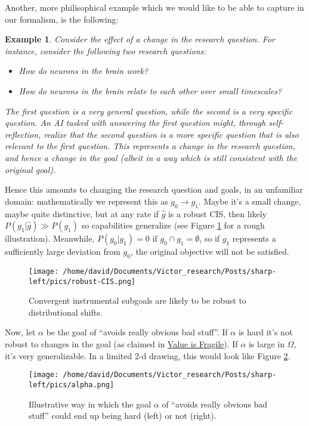 \documentclass{article}
\newtheorem{example}{Example}
\begin{document}
Another, more philisophical example which we would like to be able to capture in our formalism, is the following:

\begin{example}
    Consider the effect of a change in the research question. For instance, consider the following two research questions: 
    \begin{itemize}
        \item How do neurons in the brain work?
        \item How do neurons in the brain relate to each other over small timescales?
    \end{itemize}
    The first question is a very general question, while the second is a very specific question. An AI tasked with answering the first question might, through self-reflection, realize that the second question is a more specific question that is also relevant to the first question. This represents a change in the research question, and hence a change in the goal (albeit in a way which is still consistent with the original goal).
\end{example}

Hence this amounts to changing the research question and goals, in an unfamiliar domain: mathematically we represent this as $g_0 \rightarrow g_1$. Maybe it's a small change, maybe quite distinctive, but at any rate if $\hat{g}$ is a robust CIS, then likely $P(g_1|\hat{g})\gg P(g_1)$ so capabilities generalize (see Figure \ref{fig:robust-CIS} for a rough illustration). Meanwhile, $P(g_0|g_1)=0$ if $g_0 \cap g_1 = \emptyset$, so if $g_1$ represents a sufficiently large deviation from $g_0$, the original objective will not be satisfied.

\begin{figure}[ht]
    \centering
    \texttt{[image: /home/david/Documents/Victor\_research/Posts/sharp-left/pics/robust-CIS.png]} 
    \caption{Convergent instrumental subgoals are likely to be robust to distributional shifts.}
    \label{fig:robust-CIS} 
\end{figure}

Now, let $\alpha$ be the goal of ``avoids really obvious bad stuff''. If $\alpha$ is hard it's not robust to changes in the goal (as claimed in \href{https://www.lesswrong.com/posts/GNnHHmm8EzePmKzPk/value-is-fragile}{Value is Fragile}). If $\alpha$ is large in $\Omega$, it's very generalizable. In a limited 2-d drawing, this would look like Figure \ref{fig:alpha}.

\begin{figure}[ht]
    \centering
    \texttt{[image: /home/david/Documents/Victor\_research/Posts/sharp-left/pics/alpha.png]} 
    \caption{Illustrative way in which the goal $\alpha$ of ``avoids really obvious bad stuff'' could end up being hard (left) or not (right).}
    \label{fig:alpha} 
\end{figure}
\end{document}
